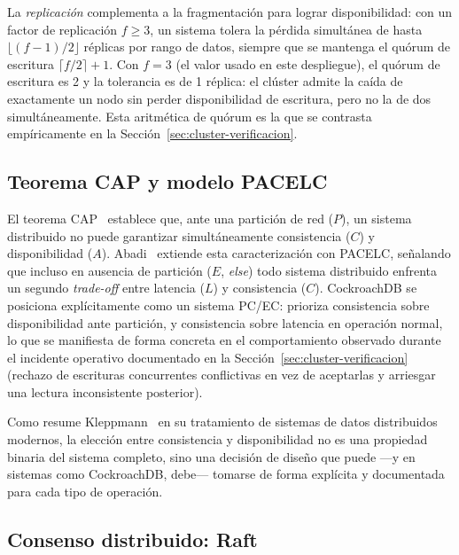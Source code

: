 \documentclass[11pt,letterpaper]{article}
\begin{document}
La \emph{replicación} complementa a la fragmentación para lograr disponibilidad: con un factor de
replicación $f \geq 3$, un sistema tolera la pérdida simultánea de hasta
$\lfloor (f-1)/2 \rfloor$ réplicas por rango de datos, siempre que se mantenga el quórum de
escritura $\lceil f/2 \rceil + 1$. Con $f = 3$ (el valor usado en este despliegue), el quórum de
escritura es 2 y la tolerancia es de 1 réplica: el clúster admite la caída de exactamente un nodo
sin perder disponibilidad de escritura, pero no la de dos simultáneamente. Esta aritmética de
quórum es la que se contrasta empíricamente en la Sección~\ref{sec:cluster-verificacion}.

\subsection{Teorema CAP y modelo PACELC}

El teorema CAP~\cite{brewer2012cap} establece que, ante una partición de red ($P$), un sistema
distribuido no puede garantizar simultáneamente consistencia ($C$) y disponibilidad ($A$).
Abadi~\cite{abadi2012consistency} extiende esta caracterización con PACELC, señalando que incluso
en ausencia de partición ($E$, \emph{else}) todo sistema distribuido enfrenta un segundo
\emph{trade-off} entre latencia ($L$) y consistencia ($C$). CockroachDB se posiciona
explícitamente como un sistema PC/EC: prioriza consistencia sobre disponibilidad ante partición, y
consistencia sobre latencia en operación normal, lo que se manifiesta de forma concreta en el
comportamiento observado durante el incidente operativo documentado en la
Sección~\ref{sec:cluster-verificacion} (rechazo de escrituras concurrentes conflictivas en vez de
aceptarlas y arriesgar una lectura inconsistente posterior).

Como resume Kleppmann~\cite{kleppmann2017ddia} en su tratamiento de sistemas de datos distribuidos
modernos, la elección entre consistencia y disponibilidad no es una propiedad binaria del sistema
completo, sino una decisión de diseño que puede —y en sistemas como CockroachDB, debe— tomarse de
forma explícita y documentada para cada tipo de operación.

\subsection{Consenso distribuido: Raft}
\end{document}
